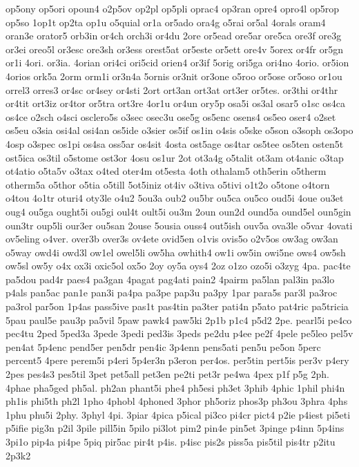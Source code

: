 {op5ony
op5ori
opoun4
o2p5ov
op2pl
op5pli
oprac4
op3ran
opre4
opro4l
op5rop
op5so
1op1t
op2ta
op1u
o5quial
or1a
or5ado
ora4g
o5rai
or5al
4orals
oram4
oran3e
orator5
orb3in
or4ch
orch3i
or4du
2ore
or5ead
ore5ar
ore5ca
ore3f
ore3g
or3ei
oreo5l
or3esc
ore3sh
or3ess
orest5at
or5este
or5ett
ore4v
5orex
or4fr
or5gn
or1i
4ori.
or3ia.
4orian
ori4ci
ori5cid
orien4
or3if
5orig
ori5ga
ori4no
4orio.
or5ion
4orios
ork5a
2orm
orm1i
or3n4a
5ornis
or3nit
or3one
o5roo
or5ose
or5oso
or1ou
orrel3
orres3
or4sc
or4sey
or4sti
2ort
ort3an
ort3at
ort3er
or5tes.
or3thi
or4thr
or4tit
ort3iz
or4tor
or5tra
ort3re
4or1u
or4un
ory5p
osa5i
os3al
osar5
o1sc
os4ca
os4ce
o2sch
o4sci
osclero5s
o3sec
osec3u
ose5g
os5enc
osens4
os5eo
oser4
o2set
os5eu
o3sia
osi4al
osi4an
os5ide
o3sier
os5if
os1in
o4sis
o5ske
o5son
o3soph
os3opo
4osp
o3spec
os1pi
os4sa
oss5ar
os4sit
4osta
ost5age
os4tar
os5tee
os5ten
osten5t
ost5ica
os3til
o5stome
ost3or
4osu
os1ur
2ot
ot3a4g
o5talit
ot3am
ot4anic
o3tap
ot4atio
o5ta5v
o3tax
o4ted
oter4m
ot5esta
4oth
othalam5
oth5erin
o5therm
otherm5a
o5thor
o5tia
o5till
5ot5iniz
ot4iv
o3tiva
o5tivi
o1t2o
o5tone
o4torn
o4tou
4o1tr
oturi4
oty3le
o4u2
5ou3a
oub2
ou5br
ou5ca
ou5co
oud5i
4oue
ou3et
oug4
ou5ga
ought5i
ou5gi
oul4t
oult5i
ou3m
2oun
oun2d
ound5a
ound5el
oun5gin
oun3tr
oup5li
our3er
ou5san
2ouse
5ousia
ouss4
out5ish
ouv5a
ova3le
o5var
4ovati
ov5eling
o4ver.
over3b
over3s
ov4ete
ovid5en
o1vis
ovis5o
o2v5os
ow3ag
ow3an
o5way
owd4i
owd3l
ow1el
owel5li
ow5ha
owhith4
ow1i
ow5in
owi5ne
ows4
ow5sh
ow5sl
ow5y
o4x
ox3i
oxic5ol
ox5o
2oy
oy5a
oys4
2oz
o1zo
ozo5i
o3zyg
4pa.
pac4te
pa5dou
pad4r
paes4
pa3gan
4pagat
pag4ati
pain2
4pairm
pa5lan
pal3in
pa3lo
p4als
pan5ac
pan1e
pan3i
pa4pa
pa3pe
pap3u
pa3py
1par
para5s
par3l
pa3roc
pa3rol
par5on
1p4as
pass5ive
pas1t
pas4tin
pa3ter
pati4n
p5ato
pat4ric
pa5tricia
5pau
paul5e
pau3p
pa5vil
5paw
pawk4
paw5ki
2p1b
p1c4
p5d2
2pe.
pearl5i
pe4co
pec4tu
2ped
5ped3a
3pede
3pedi
ped3is
3peds
pe2du
p4ee
pe2f
4pele
pe5leo
pel5v
pen4at
5p4enc
pend5er
pen5dr
pen4ic
3p4enn
pens5ati
pen5u
pe5on
5perc
percent5
4pere
perem5i
p4eri
5p4er3n
p3eron
per4os.
per5tin
pert5is
per3v
p4ery
2pes
pes4s3
pes5til
3pet
pet5all
pet3en
pe2ti
pet3r
pe4wa
4pex
p1f
p5g
2ph.
4phae
pha5ged
ph5al.
ph2an
phant5i
phe4
ph5esi
ph3et
3phib
4phic
1phil
phi4n
ph1is
phi5th
ph2l
1pho
4phobl
4phoned
3phor
ph5oriz
phos3p
ph3ou
3phra
4phs
1phu
phu5i
2phy.
3phyl
4pi.
3piar
4pica
p5ical
pi3co
pi4cr
pict4
p2ie
p4iest
pi5eti
p5ifie
pig3n
p2il
3pile
pill5in
5pilo
pi3lot
pim2
pin4e
pin5et
3pinge
p4inn
5p4ins
3pi1o
pip4a
pi4pe
5piq
pir5ac
pir4t
p4is.
p4isc
pis2s
piss5a
pis5til
pis4tr
p2itu
2p3k2
}
